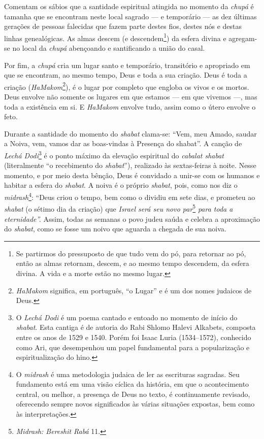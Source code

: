 Comentam os sábios que a santidade espiritual atingida no momento da
\emph{chupá} é tamanha que se encontram neste local sagrado --- e
temporário --- as dez últimas gerações de pessoas falecidas que fazem
parte destes fios, destes nós e destas linhas genealógicas. As almas
descem (e descendem\footnote{Se partirmos do pressuposto de que tudo vem
  do pó, para retornar ao pó, então as almas retornam, descem, e ao
  mesmo tempo descendem, da esfera divina. A vida e a morte estão no
  mesmo lugar.}) da esfera divina e agregam-se no local da \emph{chupá}
abençoando e santificando a união do casal.

Por fim, a \emph{chupá} cria um lugar santo e temporário, transitório e
apropriado em que se encontram, ao mesmo tempo, Deus e toda a sua
criação. Deus é toda a criação (\emph{HaMakom}\footnote{\emph{HaMakom}
  significa, em português, ``o Lugar'' e é um dos nomes judaicos de
  Deus.}), é o lugar por completo que engloba os vivos e os mortos. Deus
envolve não somente os lugares em que estamos --- em que vivemos ---,
mas toda a existência em si. E \emph{HaMakom} envolve tudo, assim como o
útero envolve o feto.

Durante a santidade do momento do \emph{shabat} clama-se: ``Vem,
meu Amado, saudar a Noiva, vem, vamos dar as boas-vindas à Presença do
shabat''. A canção de \emph{Lechá Dodi}\footnote{O \emph{Lechá Dodi} é
  um poema cantado e entoado no momento de início do \emph{shabat}. Esta
  cantiga é de autoria do Rabi Shlomo Halevi Alkabets, composta entre os
  anos de 1529 e 1540. Porém foi Isaac Luria (1534--1572), conhecido como
  Ari, que desempenhou um papel fundamental para a popularização e
  espiritualização do hino.} é o ponto máximo da elevação espiritual do
\emph{cabalat shabat} (literalmente ``o recebimento do \emph{shabat}''), realizado às
sextas-feiras à noite. Nesse momento, e por meio desta bênção, Deus é
convidado a unir-se com os humanos e habitar a esfera do \emph{shabat}.
A noiva é o próprio \emph{shabat}, pois, como nos diz o
\emph{midrash}\footnote{O \emph{midrash} é uma metodologia judaica de
  ler as escrituras sagradas. Seu fundamento está em uma visão cíclica
  da história, em que o acontecimento central, ou melhor, a presença de
  Deus no texto, é continuamente revisado, oferecendo sempre novos
  significados às várias situações expostas, bem como às interpretações.}:
``Deus criou o tempo, bem como o dividiu em sete dias, e prometeu
ao \emph{shabat} (o sétimo dia da criação) que \emph{Israel será seu novo
par}\footnote{\emph{Midrash: Bereshit Rabá} 11.} \emph{para toda a
eternidade''.} Assim, todas as semanas o povo judeu saúda e celebra a
aproximação do \emph{shabat}, como se fosse um noivo que aguarda a
chegada de sua noiva.

